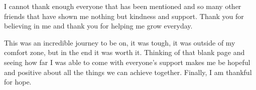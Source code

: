 \begin{ntacknowledgements}
I cannot thank enough everyone that has been mentioned and so many other friends that have shown me nothing but kindness and support. Thank you for believing in me and thank you for helping me grow everyday.

This was an incredible journey to be on, it was tough, it was outside of my comfort zone, but in the end it was worth it. Thinking of that blank page and seeing how far I was able to come with everyone's support makes me be hopeful and positive about all the things we can achieve together. Finally, I am thankful for hope.
\end{ntacknowledgements}